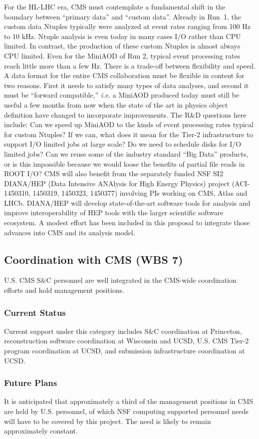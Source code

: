 \documentclass[11pt,a4paper]{article}
\begin{document}
 For the HL-LHC era, CMS must
contemplate a fundamental shift in the boundary between ``primary data''
and ``custom data''.  Already in Run~1, the custom data Ntuples typically
were analyzed at event rates ranging from 100 Hz to 10 kHz.  Ntuple
analysis is even today in many cases I/O rather than CPU limited. In
contrast, the production of these custom Ntuples is almost always CPU
limited. Even for the MiniAOD of Run 2, typical event processing rates
reach little more than a few Hz.  There is a trade-off between flexibility
and speed. A data format for the entire CMS collaboration must be
flexible in content for two reasons. First it needs to satisfy many types
of data analyses, and second it must be ``forward compatible,'' {\it i.e.} a
MiniAOD produced today must still be useful a few months from now when the
state of the art in physics object definition have changed to incorporate improvements. 
The R\&D questions here include: Can we speed up MiniAOD to the kinds of event
processing rates typical for custom Ntuples? If we can, what does it mean
for the Tier-2 infrastructure to support I/O limited jobs at large scale?
Do we need to schedule disks for I/O limited jobs?
Can we reuse some of the industry standard ``Big Data'' products, or is this impossible because we
would loose the benefits of partial file reads in ROOT I/O?
CMS will also benefit from the separately funded NSF SI2 DIANA/HEP (Data 
Intensive ANAlysis for High Energy Physics) project (ACI-1450310, 1450319,
1450323, 1450377) involving PIs working on CMS, Atlas and LHCb.
DIANA/HEP will develop state-of-the-art software tools for analysis and improve
interoperability of HEP tools with the larger scientific software ecosystem.
A modest effort has been included in this proposal to integrate those
advances into CMS and its analysis model.

\subsection{Coordination with CMS (WBS 7)}

U.S. CMS S\&C personnel are well integrated in the CMS-wide coordination
efforts and hold management positions.  

\subsubsection{Current Status}

Current support under this category includes S\&C coordination at
Princeton, reconstruction software coordination at Wisconsin and UCSD, U.S. CMS Tier-2 program coordination
at UCSD, and submission infrastructure coordination at UCSD.

\subsubsection{Future Plans}

It is anticipated that approximately a third of the management positions
in CMS are held by U.S. personnel, of which NSF computing supported 
personnel needs will have to be covered by this project.  The need
is likely to remain approximately constant.
\end{document}
